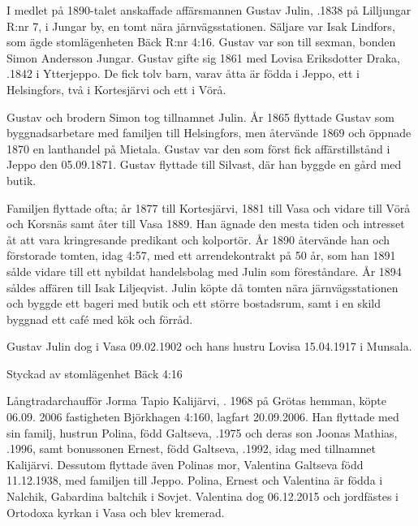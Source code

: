 I medlet på 1890-talet anskaffade affärsmannen Gustav Julin, .1838 på Lilljungar R:nr 7, i Jungar by, en tomt nära järnvägsstationen. Säljare var Isak Lindfors, som ägde stomlägenheten Bäck R:nr 4:16. Gustav var son till sexman, bonden Simon Andersson Jungar. Gustav gifte sig 1861 med Lovisa Eriksdotter Draka, .1842 i Ytterjeppo. De fick tolv barn, varav åtta är födda i Jeppo, ett i Helsingfors, två i Kortesjärvi och ett i Vörå.

Gustav och brodern Simon tog tillnamnet Julin. År 1865 flyttade Gustav som byggnadsarbetare med familjen till Helsingfors, men återvände 1869 och öppnade 1870 en lanthandel på Mietala. Gustav var den som först fick affärstillstånd i Jeppo den 05.09.1871. Gustav flyttade till Silvast, där han byggde en gård med butik.

Familjen flyttade ofta; år 1877 till Kortesjärvi, 1881 till Vasa och vidare till Vörå och Korsnäs samt åter till Vasa 1889. Han ägnade den mesta tiden och intresset åt att vara kringresande predikant	och kolportör. År 1890 återvände han och förstorade tomten, idag 4:57,	med ett arrendekontrakt på 50 år, som han 1891 sålde vidare till ett nybildat handelsbolag med Julin som föreståndare. År 1894 såldes affären till Isak Liljeqvist. Julin köpte då tomten nära järnvägsstationen och byggde ett bageri med butik och ett större bostadsrum, samt i en skild byggnad ett café med kök och förråd.

Gustav Julin dog i Vasa 09.02.1902 och hans hustru Lovisa 15.04.1917 i Munsala.




Styckad av stomlägenhet Bäck 4:16


Långtradarchaufför Jorma Tapio Kalijärvi, . 1968 på Grötas hemman, köpte 06.09. 2006 fastigheten Björkhagen 4:160, lagfart 20.09.2006. Han flyttade med sin familj, hustrun Polina, född Galtseva, .1975 och deras son Joonas Mathias, .1996, samt bonussonen Ernest, född Galtseva, .1992, idag med tillnamnet Kalijärvi. Dessutom flyttade även Polinas mor, Valentina Galtseva  född 11.12.1938, med familjen till Jeppo. Polina, Ernest och Valentina är födda i Nalchik, Gabardina baltchik i Sovjet. Valentina dog 06.12.2015 och jordfästes i Ortodoxa kyrkan i Vasa och blev kremerad.

